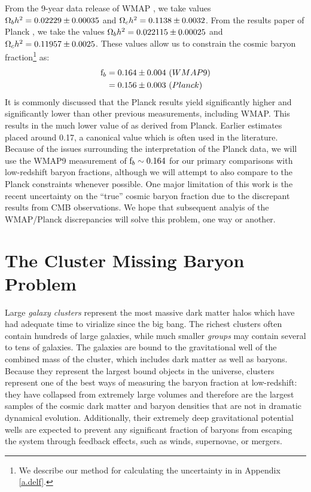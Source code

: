 From the 9-year data release of WMAP \citep[WMAP9,][]{Hinshaw2013}, we
take values $\Omega_b h^2 = 0.02229 \pm 0.00035$ and $\Omega_c h^2 =
0.1138 \pm 0.0032$. From the results paper of Planck
\citep{PlanckResultsXVI}, we take the values $\Omega_b h^2 = 0.022115
\pm 0.00025$ and $\Omega_c h^2 = 0.11957 \pm 0.0025$. These values
allow us to constrain the cosmic baryon fraction\footnote{We describe
  our method for calculating the uncertainty in \fb{} in Appendix
  \ref{a.delf}.} as:
\begin{align}
\textrm{f\ensuremath{_b}} &= 0.164 \pm 0.004 \,\,(WMAP9) \nonumber\\
&= 0.156 \pm 0.003 \,\,(Planck) \nonumber
\end{align}
It is commonly discussed  that the Planck
results yield \omegam{} significantly higher and \Ho{} significantly
lower than other previous measurements, including WMAP. This results
in the much lower value of \fb{} as derived from Planck. Earlier
estimates \citep[e.g.,WMAP5,][]{Dunkley2009} placed \fb{}
around 0.17, a canonical value which is often used in the
literature. Because of the issues surrounding the interpretation of
the Planck data, we will use the WMAP9 measurement of $\textrm{f\ensuremath{_b}}{}\sim0.164$
for our primary comparisons with low-redshift baryon fractions,
although we will attempt to also compare to the Planck constraints
whenever possible. One major limitation of this work is the recent
uncertainty on the ``true'' cosmic baryon fraction due to the
discrepant results from CMB observations. We hope that subsequent
analyis of the WMAP/Planck discrepancies will solve this problem, one
way or another.

\section{The Cluster Missing Baryon Problem}
\label{s.Missing.Clusters}

Large \textit{galaxy clusters} represent the most massive dark matter
halos which have had adequate time to virialize since the big
bang. The richest clusters often contain hundreds of large galaxies,
while much smaller \textit{groups} may contain several to tens of
galaxies. The galaxies are bound to the gravitational well of the
combined mass of the cluster, which includes dark matter as well as
baryons. Because they represent the largest bound objects in the
universe, clusters represent one of the best ways of measuring the
baryon fraction at low-redshift: they have collapsed from extremely
large volumes and therefore are the largest samples of the cosmic dark
matter and baryon densities that are not in dramatic dynamical
evolution. Additionally, their extremely deep gravitational potential
wells are expected to prevent any significant fraction of baryons from
escaping the system through feedback effects, such as winds,
supernovae, or mergers.

